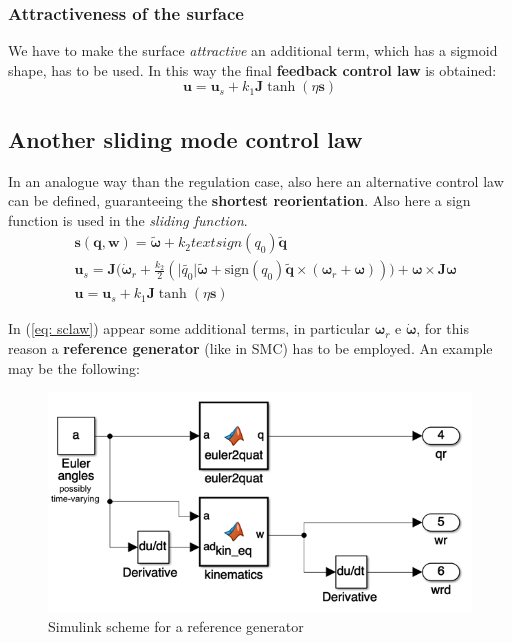 \subsubsection{Attractiveness of the surface}
We have to make the surface \textit{attractive} an additional term, which has a sigmoid shape, has to be used. In this way the final \textbf{feedback control law} is obtained:
{\Large{
    \begin{equation} \label{eq: sclaw}
        \mathbf{u} = \mathbf{u}_s + k_1 \mathbf{J} \tanh(\eta\mathbf{s})
    \end{equation}
}}

\subsection{Another sliding mode control law}
In an analogue way than the regulation case, also here an alternative control law can be defined, guaranteeing the \textbf{shortest reorientation}. Also here a sign function is used in the \textit{sliding function}. 
\begin{align*}
    &\mathbf{s}(\mathbf{q}, \boldsymbol{w}) = 
    \tilde{\boldsymbol{\omega}} +
    k_2 text{sign}(q_0) \tilde{\mathbf{q}} \\
    &\mathbf{u}_s = \mathbf{J} \biggl(
        \dot{\boldsymbol{\omega}}_r +
        \frac{k_2}{2} (\vert\tilde{q_0}\vert\tilde{\boldsymbol{\omega}}+\text{sign}(q_0)\tilde{\mathbf{q}}\times (\boldsymbol{\omega}_r+\boldsymbol{\omega}) ) \biggr)+
        \boldsymbol{\omega} \times \mathbf{J}\boldsymbol{\omega}\\
        &\mathbf{u} = \mathbf{u}_s + k_1 \mathbf{J} \tanh(\eta\mathbf{s})
\end{align*}

In (\ref{eq: sclaw}) appear some additional terms, in particular $\boldsymbol{\omega}_r$ e $\dot{\boldsymbol{\omega}}$, for this reason a \textbf{reference generator} (like in SMC) has to be employed. An example may be the following:

\begin{figure}[h]
    \centering  
    \includegraphics[scale=0.8]{AerospaceApplications/images/ref_gen.png}
    \caption{Simulink scheme for a reference generator}
\end{figure}


